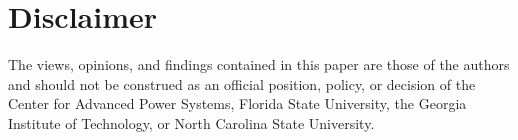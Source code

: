 \documentclass[11pt,letterpaper]{article}
\begin{document}
\section*{Disclaimer}
The views, opinions, and findings contained in this paper are those of the authors and should not be construed as an official position, policy, or decision of the Center for Advanced Power Systems, Florida State University, the Georgia Institute of Technology, or North Carolina State University.



\end{document}
